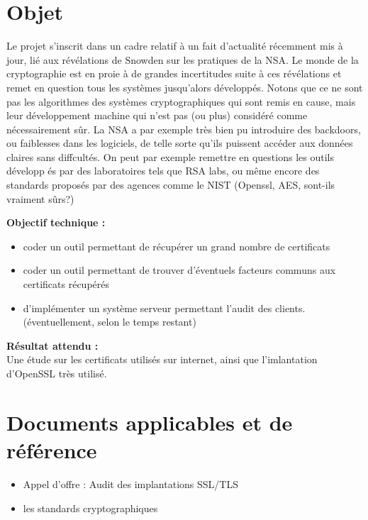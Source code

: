 \documentclass[a4paper,11pt,french]{article}
\begin{document}
\section{Objet}
Le projet s'inscrit dans un cadre relatif à un fait d'actualité récemment mis à jour, lié aux révélations de Snowden sur les pratiques de la NSA. Le monde de la cryptographie est en proie à de grandes incertitudes suite à ces révélations et remet en question tous les systèmes jusqu'alors développés. Notons que ce ne sont pas les algorithmes des systèmes cryptographiques qui sont remis en cause, mais leur développement machine qui n'est pas (ou plus) considéré comme nécessairement sûr. La NSA a par exemple très bien pu introduire des backdoors, ou faiblesses dans les logiciels, de telle sorte qu'ils puissent accéder aux données claires sans diffcultés. On peut par exemple remettre en questions les outils développ és par des laboratoires tels que RSA labs, ou même encore des standards proposés par des agences comme le NIST (Openssl, AES, sont-ils vraiment sûrs?)

\textbf{Objectif technique : }\\
\begin{itemize}
	\item coder un outil permettant de récupérer un grand nombre de certificats
	\item coder un outil permettant de trouver d'éventuels facteurs communs aux certificats récupérés
	\item  d'implémenter un système serveur permettant l'audit des clients. (éventuellement, selon le temps restant)
\end{itemize}

\textbf{Résultat attendu : }\\
Une étude sur les certificats utilisés sur internet, ainsi que l'imlantation d'OpenSSL très utilisé.

\section{Documents applicables et de référence}
\begin{itemize}
	\item Appel d'offre : Audit des implantations SSL/TLS
	\item les standards cryptographiques
\end{itemize}

\end{document}
